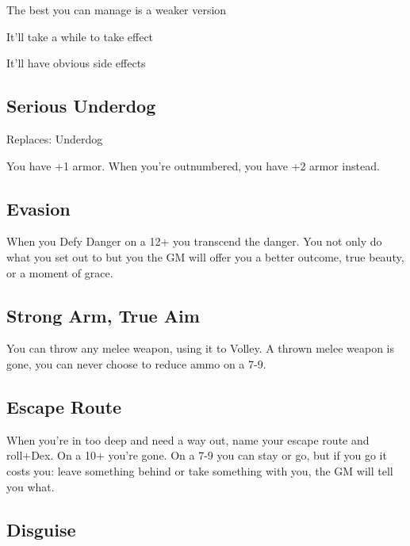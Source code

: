            
\item The best you can manage is a weaker version

           
\item It'll take a while to take effect

           
\item It'll have obvious side effects

         
\stopitemize
         
\subsection{Serious Underdog}   
         

Replaces: Underdog

         

You have +1 armor. When you're outnumbered, you have +2 armor instead.

         
\subsection{Evasion}   
         

When you Defy Danger on a 12+ you transcend the danger. You not only do what you set out to but you the GM will offer you a better outcome, true beauty, or a moment of grace.

         
\subsection{Strong Arm, True Aim}      
         

You can throw any melee weapon, using it to Volley. A thrown melee weapon is gone, you can never choose to reduce ammo on a 7-9.

         
\subsection{Escape Route}    
         

When you're in too deep and need a way out, name your escape route and roll+Dex. On a 10+ you're gone. On a 7-9 you can stay or go, but if you go it costs you: leave something behind or take something with you, the GM will tell you what.

         
\subsection{Disguise}   
         

